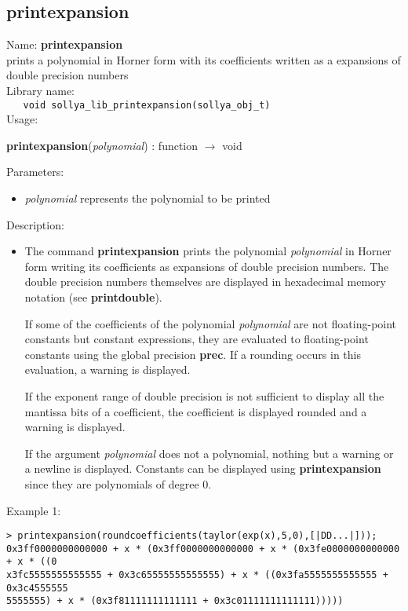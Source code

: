 \subsection{printexpansion}
\label{labprintexpansion}
\noindent Name: \textbf{printexpansion}\\
\phantom{aaa}prints a polynomial in Horner form with its coefficients written as a expansions of double precision numbers\\[0.2cm]
\noindent Library name:\\
\verb|   void sollya_lib_printexpansion(sollya_obj_t)|\\[0.2cm]
\noindent Usage: 
\begin{center}
\textbf{printexpansion}(\emph{polynomial}) : \textsf{function} $\rightarrow$ \textsf{void}\\
\end{center}
Parameters: 
\begin{itemize}
\item \emph{polynomial} represents the polynomial to be printed
\end{itemize}
\noindent Description: \begin{itemize}

\item The command \textbf{printexpansion} prints the polynomial \emph{polynomial} in Horner form
   writing its coefficients as expansions of double precision
   numbers. The double precision numbers themselves are displayed in
   hexadecimal memory notation (see \textbf{printdouble}). 
    
   If some of the coefficients of the polynomial \emph{polynomial} are not
   floating-point constants but constant expressions, they are evaluated
   to floating-point constants using the global precision \textbf{prec}.  If a
   rounding occurs in this evaluation, a warning is displayed.
    
   If the exponent range of double precision is not sufficient to display
   all the mantissa bits of a coefficient, the coefficient is displayed
   rounded and a warning is displayed.
    
   If the argument \emph{polynomial} does not a polynomial, nothing but a
   warning or a newline is displayed. Constants can be displayed using
   \textbf{printexpansion} since they are polynomials of degree $0$.
\end{itemize}
\noindent Example 1: 
\begin{center}\begin{minipage}{15cm}\begin{Verbatim}[frame=single,commandchars=\\\|\~]
> printexpansion(roundcoefficients(taylor(exp(x),5,0),[|DD...|]));
0x3ff0000000000000 + x * (0x3ff0000000000000 + x * (0x3fe0000000000000 + x * ((0
x3fc5555555555555 + 0x3c65555555555555) + x * ((0x3fa5555555555555 + 0x3c4555555
5555555) + x * (0x3f81111111111111 + 0x3c01111111111111)))))
\end{Verbatim}
\end{minipage}\end{center}
